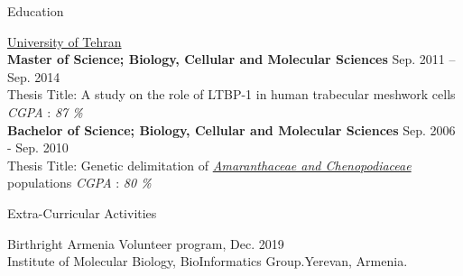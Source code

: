 \documentclass{resume}
\begin{document}
\begin{rSection}{Education}

{\href{https://science.ut.ac.ir/en/web/biology}{University of Tehran}}\\
{\bf Master of Science; Biology, Cellular and Molecular Sciences} \hfill {Sep. 2011 -- Sep. 2014}\\
 Thesis Title: A study on the role of LTBP-1 in human trabecular meshwork cells \hfill {\textit{CGPA} : \textsl{87 \%}}\\
 
{\bf Bachelor of Science; Biology, Cellular and Molecular Sciences} \hfill {Sep. 2006 - Sep. 2010}\\
 Thesis Title: Genetic delimitation of \href{https://onlinelibrary.wiley.com/doi/abs/10.1111/boj.12015}{\textit{Amaranthaceae and Chenopodiaceae}} populations \hfill {\textit{CGPA} : \textsl{80 \%}}
 
\end{rSection}

\begin{rSection}{Extra-Curricular Activities} 

    Birthright Armenia Volunteer program, \hfill Dec. 2019\\
   Institute of Molecular Biology, BioInformatics Group.\hfill Yerevan, Armenia.

\end{rSection}
\end{document}
